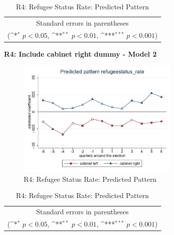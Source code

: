 \documentclass[10pt,a4paper]{scrartcl}
\begin{document}
\begin{table}[!ht]\centering
	\renewcommand{\arraystretch}{1.25}
	\def\sym#1{\ifmmode^{#1}\else\(^{#1}\)\fi}
	\caption{R4: Refugee Status Rate: Predicted Pattern}
	\begin{tabular}{l*{2}{c}}
		\hline\hline
		
		\hline\hline
		\multicolumn{3}{c}{\footnotesize Standard errors in parentheses} \\
		\multicolumn{3}{c}{\footnotesize (\sym{*} \(p<0.05\), \sym{**} \(p<0.01\), \sym{***} \(p<0.001\))}\\
	\end{tabular}
\end{table}

\clearpage
\textbf{R4: Include cabinet right dummy - Model 2}
\begin{figure}[!ht]
	\centering
	\includegraphics[width=0.7\textwidth]{figures_edited/refugeestatus_rate_graph2_R4.pdf}
	\caption{R4: Refugee Status Rate: Predicted Pattern}
\end{figure}

\begin{table}[!ht]\centering
	\footnotesize
	\renewcommand{\arraystretch}{1.2}
	\def\sym#1{\ifmmode^{#1}\else\(^{#1}\)\fi}
	\caption{R4: Refugee Status Rate: Predicted Pattern}
	\begin{tabular}{l*{2}{c}}
		\hline\hline
		
		\hline\hline
		\multicolumn{3}{c}{\footnotesize Standard errors in parentheses} \\
		\multicolumn{3}{c}{\footnotesize (\sym{*} \(p<0.05\), \sym{**} \(p<0.01\), \sym{***} \(p<0.001\))} \\
	\end{tabular}
\end{table}
\end{document}
